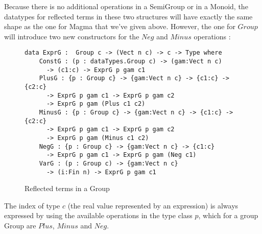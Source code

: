 %
%
Because there is no additional operations in a SemiGroup or in a Monoid, the datatypes for reflected terms in these two structures will have exactly the same shape as the one for Magma that we've given above.
However, the one for $Group$ will introduce two new constructors for the $Neg$ and $Minus$ operations :


\begin{figure}[H]
\figrule
\begin{center}
\begin{verbatim}
data ExprG :  Group c -> (Vect n c) -> c -> Type where
    ConstG : (p : dataTypes.Group c) -> (gam:Vect n c) 
      -> (c1:c) -> ExprG p gam c1
    PlusG : {p : Group c} -> {gam:Vect n c} -> {c1:c} -> {c2:c} 
      -> ExprG p gam c1 -> ExprG p gam c2 
      -> ExprG p gam (Plus c1 c2)
    MinusG : {p : Group c} -> {gam:Vect n c} -> {c1:c} -> {c2:c} 
      -> ExprG p gam c1 -> ExprG p gam c2 
      -> ExprG p gam (Minus c1 c2)
    NegG : {p : Group c} -> {gam:Vect n c} -> {c1:c} 
      -> ExprG p gam c1 -> ExprG p gam (Neg c1)
    VarG : (p : Group c) -> {gam:Vect n c} 
      -> (i:Fin n) -> ExprG p gam c1
\end{verbatim}
\end{center}
\caption{Reflected terms in a Group}
\figrule
\end{figure}

The index of type $c$ (the real value represented by an expression) is always expressed by using the available operations in the type class $p$, which for a group Group are $Plus$, $Minus$ and $Neg$.

